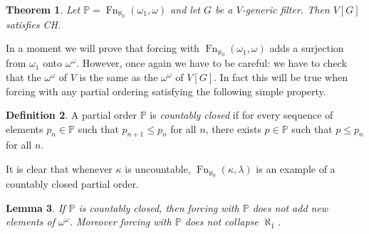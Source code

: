 \documentclass[11pt,oneside]{amsbook}
\newcommand{\PP}{\mathbb P}
\DeclareMathOperator{\Fn}{Fn}
\theoremstyle{definition}
\theoremstyle{plain}
\newtheorem{theorem}{Theorem}[section]
\newtheorem{lemma}[theorem]{Lemma}
\theoremstyle{definition}
\newtheorem{definition}[theorem]{Definition}
\theoremstyle{remark}
\numberwithin{equation}{section}
\numberwithin{figure}{section}
\begin{document}
\begin{theorem}
  \label{thm:force-ch}
  Let $\PP=\Fn_{\aleph_0}(\omega_1,\omega)$ and let $G$ be a $V$-generic filter. Then $V[G]$ satisfies CH.
\end{theorem}

In a moment we will prove that forcing with $\Fn_{\aleph_0}(\omega_1,\omega)$ adds a surjection from $\omega_1$ onto $\omega^\omega$. However, once again we have to be careful: we have to check that the $\omega^\omega$ of $V$ is the same as the $\omega^\omega$ of $V[G]$. In fact this will be true when forcing with any partial ordering satisfying the following simple property.

\begin{definition}
  A partial order $\PP$ is \emph{countably closed} if for every sequence of elements $p_n\in\PP$ such that $p_{n+1}\leq p_n$ for all $n$, there exists $p\in\PP$ such that $p\leq p_n$ for all $n$.
\end{definition}

It is clear that whenever $\kappa$ is uncountable, $\Fn_{\aleph_0}(\kappa,\lambda)$ is an example of a countably closed partial order.

\begin{lemma}
  \label{lem:forcing-closed-preserves}
  If $\PP$ is countably closed, then forcing with $\PP$ does not add new elements of $\omega^\omega$. Moreover forcing with $\PP$ does not collapse $\aleph_1$.
\end{lemma}
\end{document}
